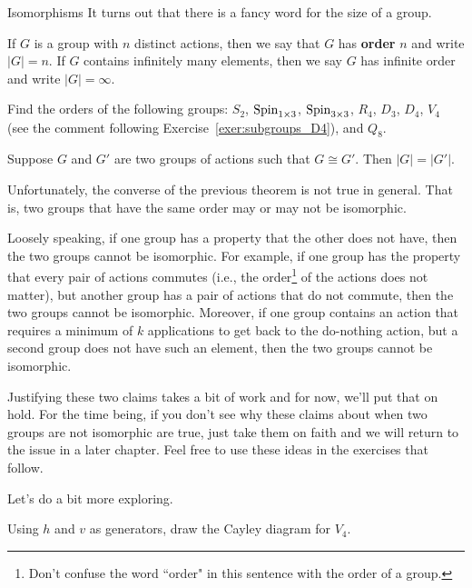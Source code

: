 \begin{section}{Isomorphisms}
It turns out that there is a fancy word for the size of a group.

\begin{definition}
If \(G\) is a group with \(n\) distinct actions, then we say that \(G\) has \textbf{order} \(n\) and write \(|G|=n\).  If \(G\) contains infinitely many elements, then we say \(G\) has infinite order and write \(|G|=\infty\).
\end{definition}

\begin{exercise}
Find the orders of the following groups: \(S_2\), \(\operatorname{Spin}_{1\times 3}\), \(\operatorname{Spin}_{3\times 3}\), \(R_4\), \(D_3\), \(D_4\), \(V_4\) (see the comment following Exercise~\ref{exer:subgroups_D4}), and \(Q_8\).
\end{exercise}

\begin{theorem}\label{thm:iso_same_order}
Suppose \(G\) and \(G'\) are two groups of actions such that \(G\cong G'\).  Then \(|G|=|G'|\).
\end{theorem}

Unfortunately, the converse of the previous theorem is not true in general.  That is, two groups that have the same order may or may not be isomorphic.  

Loosely speaking, if one group has a property that the other does not have, then the two groups cannot be isomorphic.  For example, if one group has the property that every pair of actions commutes (i.e., the order\footnote{Don't confuse the word ``order" in this sentence with the order of a group.} of the actions does not matter), but another group has a pair of actions that do not commute, then the two groups cannot be isomorphic.  Moreover, if one group contains an action that requires a minimum of \(k\) applications to get back to the do-nothing action, but a second group does not have such an element, then the two groups cannot be isomorphic.  

Justifying these two claims takes a bit of work and for now, we'll put that on hold.  For the time being, if you don't see why these claims about when two groups are not isomorphic are true, just take them on faith and we will return to the issue in a later chapter.  Feel free to use these ideas in the exercises that follow.

Let's do a bit more exploring.

\begin{exercise}
Using \(h\) and \(v\) as generators, draw the Cayley diagram for \(V_4\).
\end{exercise}


\end{section}
